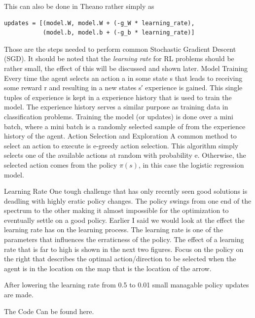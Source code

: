 This can also be done in Theano rather simply as 

\begin{lstlisting}
updates = [(model.W, model.W + (-g_W * learning_rate),
           (model.b, model.b + (-g_b * learning_rate)]
\end{lstlisting}


Those are the steps needed to perform common Stochastic Gradient Descent (SGD). It should be noted that the \textit{learning rate} \learningRate for RL problems should be rather small, the effect of this will be discussed and shown later.
Model Training
Every time the agent selects an action a in some state s that leads to receiving some reward r and resulting in a new states s′ experience is gained. This single tuples of experience is kept in a experience history that is used to train the model. The experience history serves a similar purpose as training data in classification problems. 
Training the model (or updates) is done over a mini batch, where a mini batch is a randomly selected sample of from the experience history of the agent. 
Action Selection and Exploration
A common method to select an action to execute is e-greedy action selection. This algorithm simply selects one of the available actions at random with probability e. Otherwise, the selected action comes from the policy \(\pi(s)\), in this case the logistic regression model.

Learning Rate
One tough challenge that has only recently seen good solutions is deadling with highly eratic policy changes. The policy swings from one end of the spectrum to the other making it almost impossible for the optimization to eventually settle on a good policy.
Earlier I said we would look at the effect the learning rate has on the learning process. The learning rate is one of the parameters that influences the erraticness of the policy. The effect of a learning rate that is far to high is shown in the next two figures. Focus on the policy on the right that describes the optimal action/direction to be selected when the agent is in the location on the map that is the location of the arrow.


After lowering the learning rate from 0.5 to 0.01 small managable policy updates are made.

The Code 
Can be found here.

